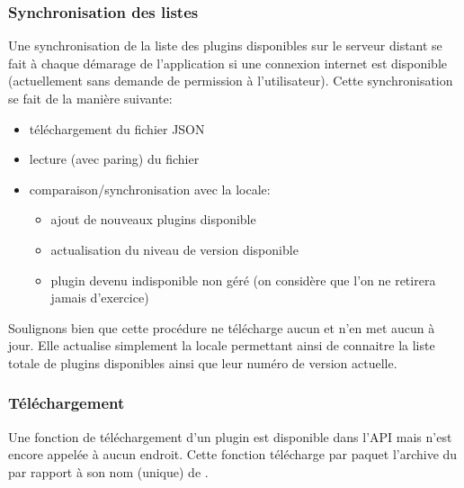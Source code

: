 \subsubsection{Synchronisation des listes}
Une synchronisation de la liste des plugins disponibles sur le serveur distant se fait à chaque démarage de l'application si une connexion internet est disponible (actuellement sans demande de permission à l'utilisateur).
Cette synchronisation se fait de la manière suivante:
\begin{itemize}
    \item téléchargement du fichier JSON
    \item lecture (avec paring) du fichier
    \item comparaison/synchronisation avec la \bdd{} locale:
    \begin{itemize}
        \item ajout de nouveaux plugins disponible
        \item actualisation du niveau de version disponible
        \item plugin devenu indisponible non géré (on considère que l'on ne retirera jamais d'exercice)
    \end{itemize}
\end{itemize}
Soulignons bien que cette procédure ne télécharge aucun \plugin{} et n'en met aucun à jour. Elle actualise simplement la \bdd{} locale permettant ainsi de connaitre la liste totale de plugins disponibles ainsi que leur numéro de version actuelle.

\subsubsection{Téléchargement}
\label{importation_plugin-telechargement}
Une fonction de téléchargement d'un plugin est disponible dans l'API mais n'est encore appelée à aucun endroit. Cette fonction télécharge par paquet l'archive du \plugin{} par rapport à son nom (unique) de \plugin{}.

